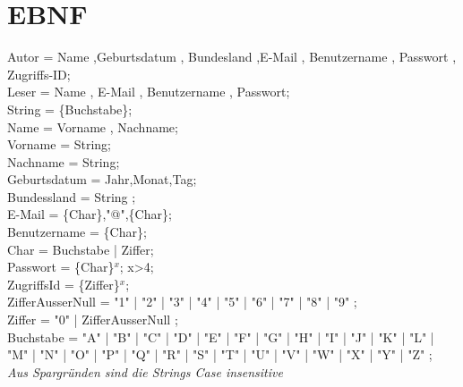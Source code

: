 \documentclass[10pt,a4paper,landscape]{article}
\begin{document}
\section{EBNF}
Autor  = Name  ,Geburtsdatum , Bundesland ,E-Mail , Benutzername , Passwort , Zugriffs-ID; \\
Leser =  Name , E-Mail , Benutzername , Passwort; \\
String = \{Buchstabe\}; \\
Name = Vorname , Nachname;\\
Vorname = String;\\
Nachname = String;\\
Geburtsdatum = Jahr,Monat,Tag;\\ 
Bundessland = String ; \\
E-Mail = \{Char\},"@",\{Char\};\\ 
Benutzername = \{Char\};\\
Char = Buchstabe | Ziffer;\\ 
Passwort = \{Char\}$^x$;  x>4;\\ 
ZugriffsId =  \{Ziffer\}$^x$;\\ 

ZifferAusserNull   = "1" | "2" | "3" | "4" | "5" | "6" | "7" | "8" | "9" ;\\
Ziffer             = "0" | ZifferAusserNull ;\\
 Buchstabe = "A" | "B" | "C" | "D" | "E" | "F" | "G"
| "H" | "I" | "J" | "K" | "L" | "M" | "N"
| "O" | "P" | "Q" | "R" | "S" | "T" | "U"
| "V" | "W" | "X" | "Y" | "Z" ; \\
\textit{Aus Spargründen sind die Strings Case insensitive}\\
\end{document}
